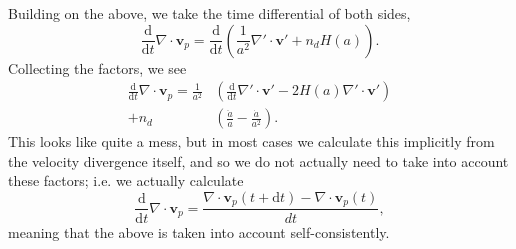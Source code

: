 Building on the above, we take the time differential of both sides,
\begin{equation}
    \frac{{\mathrm d}}{{\mathrm d} t} \nabla \cdot \mathbf{v}_p = 
    \frac{{\mathrm d}}{{\mathrm d} t} \left(
    	\frac{1}{a^2} \nabla' \cdot \mathbf{v}' + n_d H(a)
    \right).
    \nonumber
\end{equation}
Collecting the factors, we see
\begin{align}
    \frac{{\mathrm d}}{{\mathrm d} t} \nabla \cdot \mathbf{v}_p = 
    \frac{1}{a^2} &\left(
    	\frac{{\mathrm d}}{{\mathrm d} t} \nabla ' \cdot \mathbf{v}' -
    	2H(a) \nabla' \cdot \mathbf{v}'
    \right) \\
    + n_d &\left(
    	\frac{\ddot{a}}{a} - \frac{\dot{a}}{a^2}
    \right).
    \label{eqn:divvdtcodeunits}
\end{align}
This looks like quite a mess, but in most cases we calculate this implicitly
from the velocity divergence itself, and so we do not actually need to take
into account these factors; i.e. we actually calculate
\begin{equation}
    \frac{\mathrm d}{{\mathrm d} t} \nabla \cdot \mathbf{v}_p = 
    \frac{
    	\nabla \cdot \mathbf{v}_p (t + {\mathrm d}t) - \nabla \cdot \mathbf{v}_p (t)
    }{dt},
	\label{eqn:divvdtcodeunitsimplicit}
\end{equation}
meaning that the above is taken into account self-consistently.